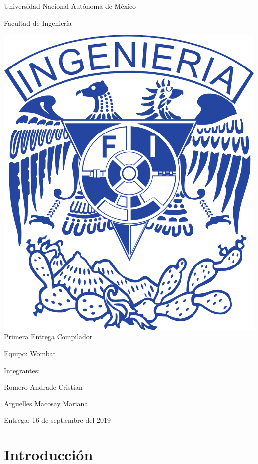 \documentclass{article}
\begin{document}
\begin{titlepage}
  \begin{center}
    \Huge{Universidad Nacional Autónoma de México}

    \Huge{Facultad de Ingeniería}
    \vfill

    \includegraphics[scale=.3]{../img/UNAM_INGENIERIA}
    \vfill
    \Large{Primera Entrega Compilador}

    
    \vfill
    \LARGE{Equipo: Wombat}
    \vfill
  \end{center}  
  
  \Large{Integrantes:
    
    \hspace{2cm}Romero Andrade Cristian
    
    \hspace{2cm}Arguelles Macosay Mariana}
  \vfill
  \Large{Entrega: 16 de septiembre del 2019}
  

  
  
\end{titlepage}

\section{Introducción}
\end{document}
